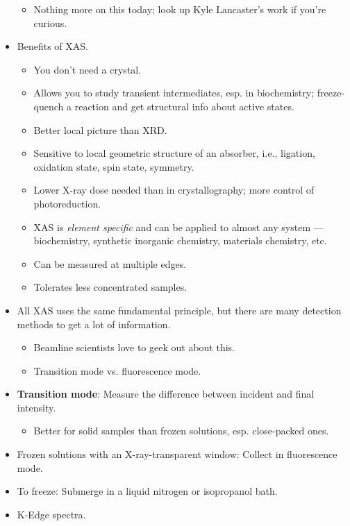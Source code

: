 \documentclass[../notes.tex]{subfiles}
\begin{document}
\begin{itemize}
\begin{itemize}
        \item Nothing more on this today; look up Kyle Lancaster's work if you're curious.
    \end{itemize}
    \item Benefits of XAS.
    \begin{itemize}
        \item You don't need a crystal.
        \item Allows you to study transient intermediates, esp. in biochemistry; freeze-quench a reaction and get structural info about active states.
        \item Better local picture than XRD.
        \item Sensitive to local geometric structure of an absorber, i.e., ligation, oxidation state, spin state, symmetry.
        \item Lower X-ray dose needed than in crystallography; more control of photoreduction.
        \item XAS is \emph{element specific} and can be applied to almost any system --- biochemistry, synthetic inorganic chemistry, materials chemistry, etc.
        \item Can be measured at multiple edges.
        \item Tolerates less concentrated samples.
    \end{itemize}
    \item All XAS uses the same fundamental principle, but there are many detection methods to get a lot of information.
    \begin{itemize}
        \item Beamline scientists love to geek out about this.
        \item Transition mode vs. fluorescence mode.
    \end{itemize}
    \item \textbf{Transition mode}: Measure the difference between incident and final intensity.
    \begin{itemize}
        \item Better for solid samples than frozen solutions, esp. close-packed ones.
    \end{itemize}
    \item Frozen solutions with an X-ray-transparent window: Collect in fluorescence mode.
    \item To freeze: Submerge in a liquid nitrogen or isopropanol bath.
    \item K-Edge spectra.
    \begin{itemize}

\end{itemize}
\end{itemize}
\end{document}
